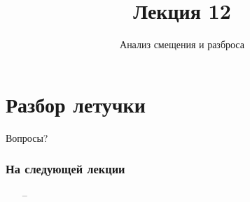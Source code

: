 \documentclass[10pt]{beamer}
\title{Лекция 12}
\subtitle{Анализ смещения и разброса}
\begin{document}
\maketitle

\section{Разбор летучки}

\begin{frame}{}
  
\end{frame}

\begin{frame}[standout]
  Вопросы?
\end{frame}

\appendix

\begin{frame}\frametitle{На следующей лекции}
	\begin{itemize}
    	\item[--]  	    	
	\end{itemize}
\end{frame}
\end{document}
